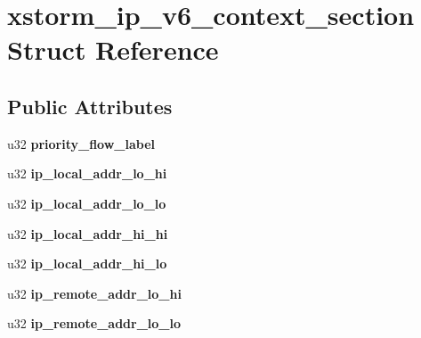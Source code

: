 \hypertarget{structxstorm__ip__v6__context__section}{
\section{xstorm\_\-ip\_\-v6\_\-context\_\-section Struct Reference}
\label{structxstorm__ip__v6__context__section}
}
\subsection*{Public Attributes}
\begin{DoxyCompactItemize}
\item 
\hypertarget{structxstorm__ip__v6__context__section_a19d4cef05d30f2cf7f7e79f4e8233373}{
u32 {\bfseries priority\_\-flow\_\-label}}
\label{structxstorm__ip__v6__context__section_a19d4cef05d30f2cf7f7e79f4e8233373}

\item 
\hypertarget{structxstorm__ip__v6__context__section_a4cccd322d007f931daaa08fcf0f1297a}{
u32 {\bfseries ip\_\-local\_\-addr\_\-lo\_\-hi}}
\label{structxstorm__ip__v6__context__section_a4cccd322d007f931daaa08fcf0f1297a}

\item 
\hypertarget{structxstorm__ip__v6__context__section_a6000d5a681aba52943036c86ed524913}{
u32 {\bfseries ip\_\-local\_\-addr\_\-lo\_\-lo}}
\label{structxstorm__ip__v6__context__section_a6000d5a681aba52943036c86ed524913}

\item 
\hypertarget{structxstorm__ip__v6__context__section_aabb569848d3898a18a849629065e07a6}{
u32 {\bfseries ip\_\-local\_\-addr\_\-hi\_\-hi}}
\label{structxstorm__ip__v6__context__section_aabb569848d3898a18a849629065e07a6}

\item 
\hypertarget{structxstorm__ip__v6__context__section_a260894a38ffb65517a1b5fef30be3907}{
u32 {\bfseries ip\_\-local\_\-addr\_\-hi\_\-lo}}
\label{structxstorm__ip__v6__context__section_a260894a38ffb65517a1b5fef30be3907}

\item 
\hypertarget{structxstorm__ip__v6__context__section_a25d92d38b922fc8c2f286be04c73c80c}{
u32 {\bfseries ip\_\-remote\_\-addr\_\-lo\_\-hi}}
\label{structxstorm__ip__v6__context__section_a25d92d38b922fc8c2f286be04c73c80c}

\item 
\hypertarget{structxstorm__ip__v6__context__section_ad4b6067c4236ccf56cf18a2a001b4138}{
u32 {\bfseries ip\_\-remote\_\-addr\_\-lo\_\-lo}}
\label{structxstorm__ip__v6__context__section_ad4b6067c4236ccf56cf18a2a001b4138}


\end{DoxyCompactItemize}
